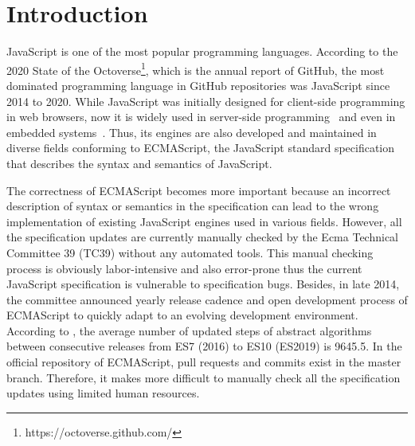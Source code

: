 \section{Introduction}\label{sec:intro}

JavaScript is one of the most popular programming languages.  According to the
2020 State of the Octoverse\footnote{https://octoverse.github.com/}, which is
the annual report of GitHub, the most dominated programming language in GitHub
repositories was JavaScript since 2014 to 2020.  While JavaScript was initially
designed for client-side programming in web browsers, now it is widely used in
server-side programming~\cite{nodejs} and even in embedded
systems~\cite{espruino, tessel2, moddable}.  Thus, its engines are also
developed and maintained in diverse fields conforming to ECMAScript, the
JavaScript standard specification that describes the syntax and semantics of
JavaScript.

The correctness of ECMAScript becomes more important because an incorrect
description of syntax or semantics in the specification can lead to the wrong
implementation of existing JavaScript engines used in various fields.  However,
all the specification updates are currently manually checked by the Ecma
Technical Committee 39 (TC39) without any automated tools.  This manual checking
process is obviously labor-intensive and also error-prone thus the current
JavaScript specification is vulnerable to specification bugs.  Besides, in late
2014, the committee announced yearly release cadence and open development
process of ECMAScript to quickly adapt to an evolving development environment.
According to \citet{jiset}, the average number of updated steps of abstract
algorithms between consecutive releases from ES7 (2016) to ES10 (ES2019) is
9645.5.  In the official repository of ECMAScript,  pull requests
and  commits exist in the master branch.  Therefore, it makes more
difficult to manually check all the specification updates using limited human
resources.

